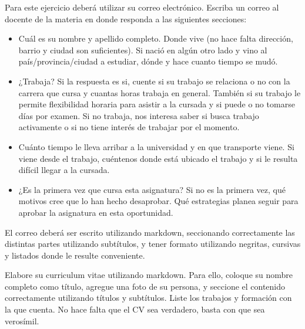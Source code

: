 \documentclass[12pt, addpoints]{../../common/epyl_exam_template}
\begin{document}
\begin{questions}
  \question
    Para este ejercicio deberá utilizar su correo electrónico. Escriba un correo
    al docente de la materia en donde responda a las siguientes secciones:
    \begin{itemize}
      \item Cuál es su nombre y apellido completo. Donde vive (no hace falta
        dirección, barrio y ciudad son suficientes). Si nació en algún otro
        lado y vino al país/provincia/ciudad a estudiar, dónde y hace cuanto
        tiempo se mudó.
      \item ¿Trabaja? Si la respuesta es si, cuente si su trabajo se
        relaciona o no con la carrera que cursa y cuantas horas trabaja en
        general. También si su trabajo le permite flexibilidad horaria para
        asistir a la cursada y si puede o no tomarse días por examen.
        Si no trabaja, nos interesa saber si busca trabajo activamente o si
        no tiene interés de trabajar por el momento.
      \item Cuánto tiempo le lleva arribar a la universidad y en que
        transporte viene. Si viene desde el trabajo, cuéntenos donde está
        ubicado el trabajo y si le resulta difícil llegar a la cursada.
      \item ¿Es la primera vez que cursa esta asignatura? Si no es la primera
        vez, qué motivos cree que lo han hecho desaprobar. Qué estrategias
        planea seguir para aprobar la asignatura en esta oportunidad.
    \end{itemize}
    El correo deberá ser escrito utilizando markdown, seccionando correctamente
    las distintas partes utilizando subtítulos, y tener formato utilizando negritas,
    cursivas y listados donde le resulte conveniente.

  \question
    Elabore su curriculum vitae utilizando markdown. Para ello, coloque su nombre
    completo como título, agregue una foto de su persona, y seccione el contenido
    correctamente utilizando títulos y subtítulos. Liste los trabajos y formación
    con la que cuenta. No hace falta que el CV sea verdadero, basta con que sea
    verosímil.

\end{questions}
\end{document}

